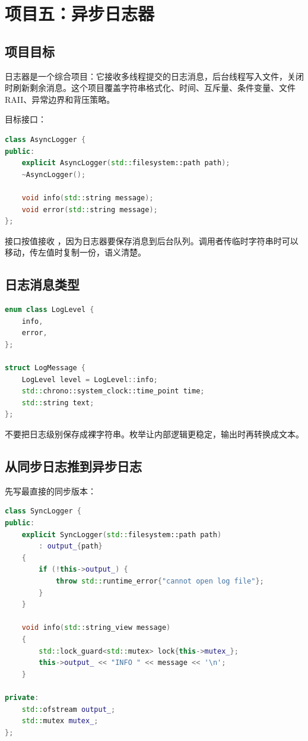 \chapter{项目五：异步日志器}

\section{项目目标}

日志器是一个综合项目：它接收多线程提交的日志消息，后台线程写入文件，关闭时刷新剩余消息。这个项目覆盖字符串格式化、时间、互斥量、条件变量、文件 RAII、异常边界和背压策略。

目标接口：

\begin{lstlisting}[language=C++,caption={日志器接口}]
class AsyncLogger {
public:
    explicit AsyncLogger(std::filesystem::path path);
    ~AsyncLogger();

    void info(std::string message);
    void error(std::string message);
};
\end{lstlisting}

接口按值接收 ，因为日志器要保存消息到后台队列。调用者传临时字符串时可以移动，传左值时复制一份，语义清楚。

\section{日志消息类型}

\begin{lstlisting}[language=C++,caption={日志消息}]
enum class LogLevel {
    info,
    error,
};

struct LogMessage {
    LogLevel level = LogLevel::info;
    std::chrono::system_clock::time_point time;
    std::string text;
};
\end{lstlisting}

不要把日志级别保存成裸字符串。枚举让内部逻辑更稳定，输出时再转换成文本。

\section{从同步日志推到异步日志}

先写最直接的同步版本：

\begin{lstlisting}[language=C++,caption={同步日志器}]
class SyncLogger {
public:
    explicit SyncLogger(std::filesystem::path path)
        : output_{path}
    {
        if (!this->output_) {
            throw std::runtime_error{"cannot open log file"};
        }
    }

    void info(std::string_view message)
    {
        std::lock_guard<std::mutex> lock{this->mutex_};
        this->output_ << "INFO " << message << '\n';
    }

private:
    std::ofstream output_;
    std::mutex mutex_;
};
\end{lstlisting}

